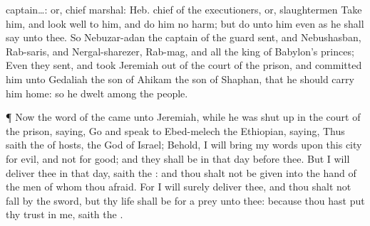 {{captain…: or, chief marshal: Heb. chief of the executioners, or, slaughtermen}
Take him, and look
well to him, and
do him no
harm; but
do unto him even as he shall
say unto thee.
So
Nebuzar-adan the
captain of the
guard
sent, and
Nebushasban,
Rab-saris, and
Nergal-sharezer,
Rab-mag, and all the
king of
Babylon’s
princes;
Even they
sent, and
took
Jeremiah out of the
court of the
prison, and
committed him unto
Gedaliah the
son of
Ahikam the
son of
Shaphan, that he should
carry him
home: so he
dwelt
among the
people.
\par }{\PP {}¶ Now the
word of the
{} came unto
Jeremiah, while he was shut
up in the
court of the
prison,
saying,
Go and
speak to
Ebed-melech the
Ethiopian,
saying, Thus
saith the
{} of
hosts, the
God of
Israel; Behold, I will
bring my
words upon this
city for
evil, and not for
good; and they shall be
{} in that
day
before thee.
But I will
deliver thee in that
day,
saith the
{}: and thou shalt not be
given into the
hand of the
men of
whom thou
{}
afraid.
For I will
surely
deliver thee, and thou shalt not
fall by the
sword, but thy
life shall be for a
prey unto thee: because thou hast put thy
trust in me,
saith the
{}.

}
